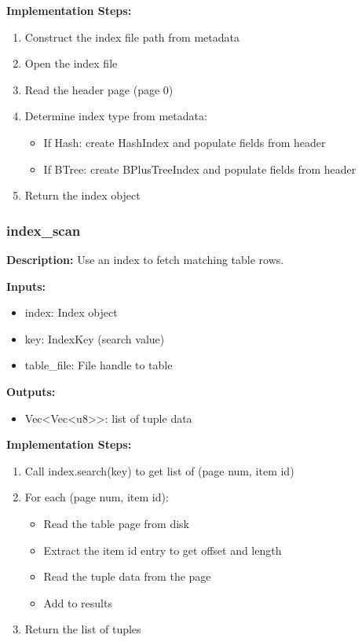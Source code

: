 \documentclass[11pt,a4paper]{article}
\begin{document}
\textbf{Implementation Steps:}
\begin{enumerate}
\item Construct the index file path from metadata
\item Open the index file
\item Read the header page (page 0)
\item Determine index type from metadata:
    \begin{itemize}
    \item If Hash: create HashIndex and populate fields from header
    \item If BTree: create BPlusTreeIndex and populate fields from header
    \end{itemize}
\item Return the index object
\end{enumerate}

\subsubsection{index\_scan}

\textbf{Description:} Use an index to fetch matching table rows.

\textbf{Inputs:}
\begin{itemize}
\item index: Index object
\item key: IndexKey (search value)
\item table\_file: File handle to table
\end{itemize}

\textbf{Outputs:}
\begin{itemize}
\item Vec<Vec<u8>{}>: list of tuple data
\end{itemize}

\textbf{Implementation Steps:}
\begin{enumerate}
\item Call index.search(key) to get list of (page num, item id)
\item For each (page num, item id):
    \begin{itemize}
    \item Read the table page from disk
    \item Extract the item id entry to get offset and length
    \item Read the tuple data from the page
    \item Add to results
    \end{itemize}
\item Return the list of tuples
\end{enumerate}
\end{document}
